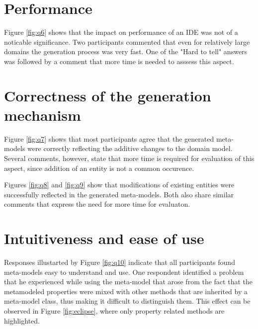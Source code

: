 \section{Performance}
\noindent Figure \ref{fig:q6} shows that the impact on performance of an IDE was not of a noticable significance.
Two participants commented that even for relatively large domains the generation process was very fast.
One of the "Hard to tell" answers was followed by a comment that more time is needed to asssess this aspect.

\section{Correctness of the generation mechanism}
\noindent Figure \ref{fig:q7} shows that most participants agree that the generated meta-models were correctly reflecting the additive changes to the domain model.
Several comments, however, state that more time is required for evaluation of this aspect, since addition of an entity is not a common occurence.

\noindent Figures \ref{fig:q8} and \ref{fig:q9} show that modifications of existing entities were successfully reflected in the generated meta-models.
Both also share similar comments that express the need for more time for evaluaton.


\section{Intuitiveness and ease of use}
\noindent Responses illustarted by Figure \ref{fig:q10} indicate that all participants found meta-models easy to understand and use.
One respondent identified a problem that he experienced while using the meta-model that arose from the fact that the metamodeled properties were mixed with other methods that are inherited by a meta-model class, thus making it difficult to distinguish them.
This effect can be observed in Figure \ref{fig:eclipse}, where only property related methods are highlighted.

